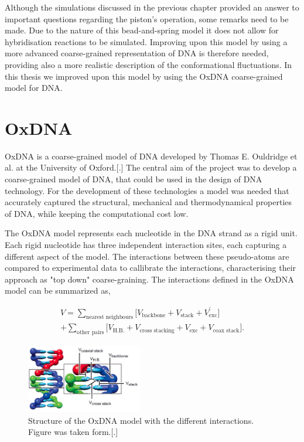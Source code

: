 \vspace{1cm}
Although the simulations discussed in the previous chapter provided an answer to
important questions regarding the piston's operation, some remarks need to be made. Due
to the nature of this bead-and-spring model it does not allow for hybridisation reactions
to be simulated. Improving upon this model by using a more advanced coarse-grained
representation of DNA is therefore needed, providing also a more realistic description of
the conformational fluctuations. In this thesis we improved upon this model by using the
OxDNA coarse-grained model for DNA.\\


\section{OxDNA}


OxDNA is a coarse-grained model of DNA developed by Thomas E. Ouldridge et al. at the
University of Oxford.[.] The central aim of the project was to develop a coarse-grained
model of DNA, that could be used in the design of DNA technology. For the development of
these technologies a model was needed that accurately captured the structural, mechanical
and thermodynamical properties of DNA, while keeping the computational cost low.

The OxDNA model represents each nucleotide in the DNA strand as a rigid unit. Each rigid
nucleotide has three independent interaction sites, each capturing a different aspect of
the model. The interactions between these pseudo-atoms are compared to experimental
data to callibrate the interactions, characterising their approach as "top down"
coarse-graining. The interactions defined in the OxDNA model can be summarized as,

\begin{equation}
  \begin{aligned}
    V = \sum_{\text{nearest neighbours}} \bigg[ V_{\text{backbone}} + V_{\text{stack}} +
    V^{'}_{\text{exc}}\bigg]\\
    + \sum_{\text{other pairs}} \bigg[V_{\text{H.B.}} + V_{\text{cross stacking}} +
    V_{\text{exc}} + V_{\text{coax stack}}\bigg].
  \end{aligned}
\end{equation}

\begin{figure}
  \begin{center}
    \includegraphics[width=0.45\textwidth]{Figures/oxDNA_model.png}
  \end{center}
  \caption{Structure of the OxDNA model with the different interactions.
  Figure was taken form.[.]}
\end{figure}

